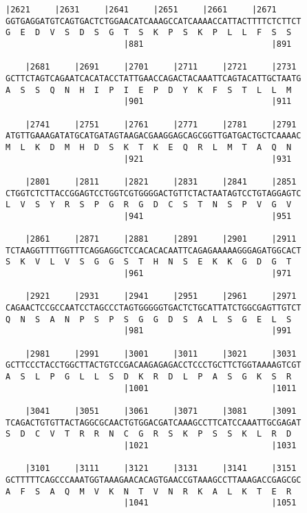 \documentclass{article}
\begin{document}
\newpage
\begin{Verbatim}[fontfamily=courier]
    |2621     |2631     |2641     |2651     |2661     |2671 
GGTGAGGATGTCAGTGACTCTGGAACATCAAAGCCATCAAAACCATTACTTTTCTCTTCT
G  E  D  V  S  D  S  G  T  S  K  P  S  K  P  L  L  F  S  S  
                        |881                          |891  

    |2681     |2691     |2701     |2711     |2721     |2731 
GCTTCTAGTCAGAATCACATACCTATTGAACCAGACTACAAATTCAGTACATTGCTAATG
A  S  S  Q  N  H  I  P  I  E  P  D  Y  K  F  S  T  L  L  M  
                        |901                          |911  

    |2741     |2751     |2761     |2771     |2781     |2791 
ATGTTGAAAGATATGCATGATAGTAAGACGAAGGAGCAGCGGTTGATGACTGCTCAAAAC
M  L  K  D  M  H  D  S  K  T  K  E  Q  R  L  M  T  A  Q  N  
                        |921                          |931  

    |2801     |2811     |2821     |2831     |2841     |2851 
CTGGTCTCTTACCGGAGTCCTGGTCGTGGGGACTGTTCTACTAATAGTCCTGTAGGAGTC
L  V  S  Y  R  S  P  G  R  G  D  C  S  T  N  S  P  V  G  V  
                        |941                          |951  

    |2861     |2871     |2881     |2891     |2901     |2911 
TCTAAGGTTTTGGTTTCAGGAGGCTCCACACACAATTCAGAGAAAAAGGGAGATGGCACT
S  K  V  L  V  S  G  G  S  T  H  N  S  E  K  K  G  D  G  T  
                        |961                          |971  

    |2921     |2931     |2941     |2951     |2961     |2971 
CAGAACTCCGCCAATCCTAGCCCTAGTGGGGGTGACTCTGCATTATCTGGCGAGTTGTCT
Q  N  S  A  N  P  S  P  S  G  G  D  S  A  L  S  G  E  L  S  
                        |981                          |991  

    |2981     |2991     |3001     |3011     |3021     |3031 
GCTTCCCTACCTGGCTTACTGTCCGACAAGAGAGACCTCCCTGCTTCTGGTAAAAGTCGT
A  S  L  P  G  L  L  S  D  K  R  D  L  P  A  S  G  K  S  R  
                        |1001                         |1011 

    |3041     |3051     |3061     |3071     |3081     |3091 
TCAGACTGTGTTACTAGGCGCAACTGTGGACGATCAAAGCCTTCATCCAAATTGCGAGAT
S  D  C  V  T  R  R  N  C  G  R  S  K  P  S  S  K  L  R  D  
                        |1021                         |1031 

    |3101     |3111     |3121     |3131     |3141     |3151 
GCTTTTTCAGCCCAAATGGTAAAGAACACAGTGAACCGTAAAGCCTTAAAGACCGAGCGC
A  F  S  A  Q  M  V  K  N  T  V  N  R  K  A  L  K  T  E  R  
                        |1041                         |1051 

\end{Verbatim}
\end{document}
